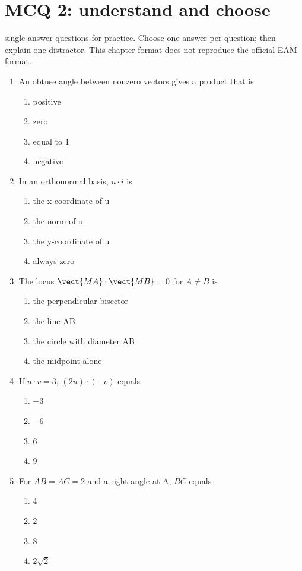 \endgroup
\begingroup\small
{}\section*{MCQ 2: understand and choose}\label{C03-Q2}
 single-answer questions for practice. Choose one answer per question; then explain one distractor. This chapter format does not reproduce the official EAM format.
\begin{enumerate}
\item An obtuse angle between nonzero vectors gives a product that is
\begin{enumerate}[label=\Alph*.,itemsep=2pt]
\item positive
\item zero
\item equal to 1
\item negative
\end{enumerate}
\item In an orthonormal basis, $u\cdot i$ is
\begin{enumerate}[label=\Alph*.,itemsep=2pt]
\item the x-coordinate of u
\item the norm of u
\item the y-coordinate of u
\item always zero
\end{enumerate}
\item The locus $\vect{MA}\cdot\vect{MB}=0$ for $A\ne B$ is
\begin{enumerate}[label=\Alph*.,itemsep=2pt]
\item the perpendicular bisector
\item the line AB
\item the circle with diameter AB
\item the midpoint alone
\end{enumerate}
\item If $u\cdot v=3$, $(2u)\cdot(-v)$ equals
\begin{enumerate}[label=\Alph*.,itemsep=2pt]
\item $-3$
\item $-6$
\item $6$
\item $9$
\end{enumerate}
\item For $AB=AC=2$ and a right angle at A, $BC$ equals
\begin{enumerate}[label=\Alph*.,itemsep=2pt]
\item $4$
\item $2$
\item $8$
\item $2\sqrt2$
\end{enumerate}
\end{enumerate}
